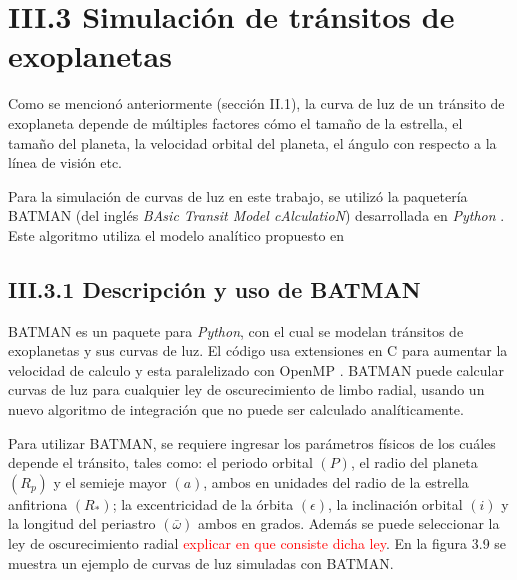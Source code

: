 \section*{III.3 Simulación de tránsitos de exoplanetas}


Como se mencionó anteriormente (sección II.1), la curva de luz de un tránsito de exoplaneta depende de múltiples factores cómo el tamaño de la estrella, el tamaño del planeta, la velocidad orbital del planeta, el ángulo con respecto a la línea de visión etc.

Para la simulación de curvas de luz en este trabajo, se utilizó la paquetería BATMAN (del inglés \textit{BAsic Transit Model cAlculatioN}) desarrollada en \textit{Python} \cite{kreidberg2015batman}. Este algoritmo utiliza el modelo analítico propuesto en \cite{mandel2002analytic}


\subsection*{III.3.1 Descripción y uso de BATMAN}

BATMAN es un paquete para \textit{Python}, con el cual se modelan tránsitos de exoplanetas y sus curvas de luz. El código usa extensiones en C para aumentar la velocidad de calculo y esta paralelizado con OpenMP \cite{kreidberg2015batman}. BATMAN puede calcular curvas de luz para cualquier ley de oscurecimiento de limbo radial, usando un nuevo algoritmo de integración que no puede ser calculado analíticamente.

Para utilizar BATMAN, se requiere ingresar los parámetros físicos de los cuáles depende el tránsito, tales como: el periodo orbital $(P)$, el radio del planeta $(R_{p})$ y el semieje mayor $(a)$, ambos en unidades del radio de la estrella anfitriona $(R_{*})$;  la excentricidad de la órbita $(\epsilon)$, la inclinación orbital $(i)$ y la longitud del periastro $(\bar{\omega})$ ambos en grados. Además se puede seleccionar la ley de oscurecimiento radial \textcolor{red}{explicar en que consiste dicha ley}. En la figura 3.9 se muestra un ejemplo de curvas de luz simuladas con BATMAN. 

